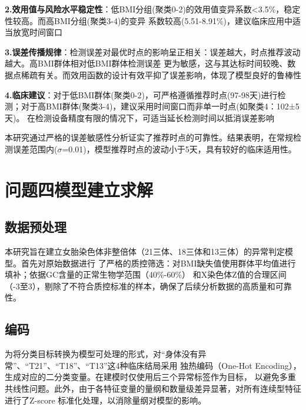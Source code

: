 \documentclass{article}
\begin{document}
\textbf{2.效用值与风险水平稳定性}：低BMI分组(聚类0-2)的效用值变异系数<3.5\%，稳定性较高。而高BMI分组(聚类3-4)的变异
系数较高(5.51-8.91\%)，建议临床应用中适当放宽时间窗口

\textbf{3.误差传播规律}：检测误差对最优时点的影响呈正相关：误差越大，时点推荐波动越大。高BMI群体相对低BMI群体检测误差
更为敏感，这与其达标时间较晚、数据点稀疏有关。而效用函数的设计有效平抑了误差影响，体现了模型良好的鲁棒性

\textbf{4.临床建议}：对于低BMI群体(聚类0-2)，可严格遵循推荐时点(97-98天)进行检测；对于高BMI群体(聚类3-4)，建议采用时间窗口而非单一时点(如聚类4：102±5天)。
在检测设备精度有限的情况下，可适当延长检测时间以抵消误差影响

本研究通过严格的误差敏感性分析证实了推荐时点的可靠性。结果表明，在常规检测误差范围内($\sigma$=0.01)，模型推荐时点的波动小于5天，具有较好的临床适用性。



\section{\textbf{问题四模型建立求解}}
\subsection{\textbf{数据预处理}}
本研究旨在建立女胎染色体非整倍体（21三体、18三体和13三体）的异常判定模型。首先对原始数据进行
了严格的质控筛选：对BMI缺失值使用群体平均值进行填补；依据GC含量的正常生物学范围（40\%-60\%）
和X染色体Z值的合理区间（-3至3），剔除了不符合质控标准的样本，确保了后续分析数据的高质量和可靠性。
\subsection{\textbf{编码}}
为将分类目标转换为模型可处理的形式，对“身体没有异常”、“T21”、“T18”、“T13”这4种临床结局采用
独热编码（One-Hot Encoding），生成对应的二分类变量。在建模时仅使用后三个异常标签作为目标，
以避免多重共线性问题。此外，由于各特征变量的量纲和数量级差异显著，对所有连续型特征进行了Z-score
标准化处理，以消除量纲对模型的影响。
\end{document}
